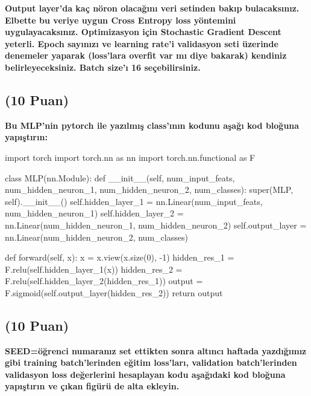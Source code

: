 \documentclass[11pt]{article}
\begin{document}
\textbf{Output layer'da kaç nöron olacağını veri setinden bakıp bulacaksınız. Elbette bu veriye uygun Cross Entropy loss yöntemini uygulayacaksınız. Optimizasyon için Stochastic Gradient Descent yeterli. Epoch sayınızı ve learning rate'i validasyon seti üzerinde denemeler yaparak (loss'lara overfit var mı diye bakarak) kendiniz belirleyeceksiniz. Batch size'ı 16 seçebilirsiniz.}

\subsection{(10 Puan)} \textbf{Bu MLP'nin pytorch ile yazılmış class'ının kodunu aşağı kod bloğuna yapıştırın:}

\begin{python}
import torch
import torch.nn as nn
import torch.nn.functional as F

class MLP(nn.Module):
    def __init__(self, num_input_feats, num_hidden_neuron_1, num_hidden_neuron_2, num_classes):
        super(MLP, self).__init__()
        self.hidden_layer_1 = nn.Linear(num_input_feats, num_hidden_neuron_1)
        self.hidden_layer_2 = nn.Linear(num_hidden_neuron_1, num_hidden_neuron_2)
        self.output_layer = nn.Linear(num_hidden_neuron_2, num_classes)
        
    def forward(self, x):
        x = x.view(x.size(0), -1)
        hidden_res_1 = F.relu(self.hidden_layer_1(x))
        hidden_res_2 = F.relu(self.hidden_layer_2(hidden_res_1))
        output = F.sigmoid(self.output_layer(hidden_res_2))
        return output
\end{python}

\subsection{(10 Puan)} \textbf{SEED=öğrenci numaranız set ettikten sonra altıncı haftada yazdığımız gibi training batch'lerinden eğitim loss'ları, validation batch'lerinden validasyon loss değerlerini hesaplayan kodu aşağıdaki kod bloğuna yapıştırın ve çıkan figürü de alta ekleyin.}
\end{document}
